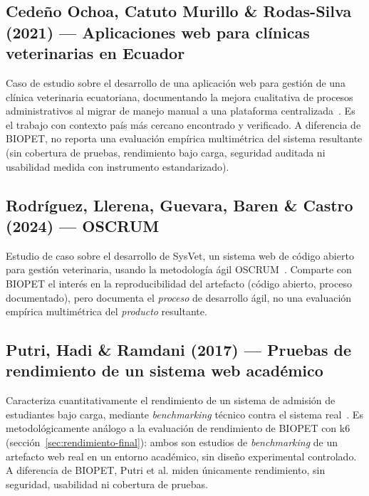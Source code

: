 \subsection{Cede\~no Ochoa, Catuto Murillo \& Rodas-Silva (2021) --- Aplicaciones web para cl\'inicas veterinarias en Ecuador}
Caso de estudio sobre el desarrollo de una aplicaci\'on web para gesti\'on
de una cl\'inica veterinaria ecuatoriana, documentando la mejora
cualitativa de procesos administrativos al migrar de manejo manual a una
plataforma centralizada~\cite{cedeno2021veterinaria}. Es el trabajo con
contexto pa\'is m\'as cercano encontrado y verificado. A diferencia de
BIOPET, no reporta una evaluaci\'on emp\'irica multim\'etrica del sistema
resultante (sin cobertura de pruebas, rendimiento bajo carga, seguridad
auditada ni usabilidad medida con instrumento estandarizado).

\subsection{Rodr\'iguez, Llerena, Guevara, Baren \& Castro (2024) --- OSCRUM}
Estudio de caso sobre el desarrollo de SysVet, un sistema web de c\'odigo
abierto para gesti\'on veterinaria, usando la metodolog\'ia \'agil
OSCRUM~\cite{rodriguez2024oscrum}. Comparte con BIOPET el inter\'es en la
reproducibilidad del artefacto (c\'odigo abierto, proceso documentado),
pero documenta el \emph{proceso} de desarrollo \'agil, no una evaluaci\'on
emp\'irica multim\'etrica del \emph{producto} resultante.

\subsection{Putri, Hadi \& Ramdani (2017) --- Pruebas de rendimiento de un sistema web acad\'emico}
Caracteriza cuantitativamente el rendimiento de un sistema de admisi\'on
de estudiantes bajo carga, mediante \emph{benchmarking} t\'ecnico contra el
sistema real~\cite{putri2017perftesting}. Es metodol\'ogicamente an\'alogo a
la evaluaci\'on de rendimiento de BIOPET con k6
(secci\'on~\ref{sec:rendimiento-final}): ambos son estudios de
\emph{benchmarking} de un artefacto web real en un entorno acad\'emico, sin
dise\~no experimental controlado. A diferencia de BIOPET, Putri et al.
miden \'unicamente rendimiento, sin seguridad, usabilidad ni cobertura de
pruebas.

